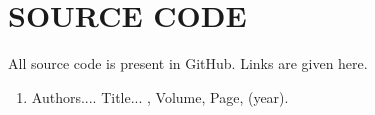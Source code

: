 \documentclass[DD]{iitmdiss}
\begin{document}
\appendix

\chapter{SOURCE CODE}

All source code is present in GitHub. Links are given here.


\begin{singlespace}
	
\end{singlespace}



\listofpapers

\begin{enumerate}  
\item Authors....  \newblock
 Title...
  , Volume,
  Page, (year).
\end{enumerate}  
\end{document}
